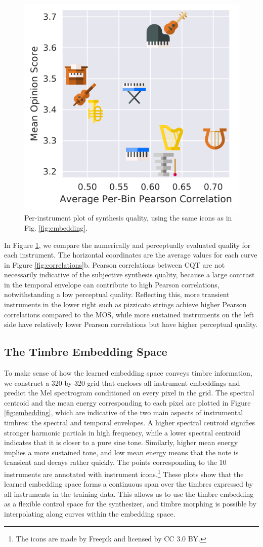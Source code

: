 \begin{figure}[t]
	\centering
	\includegraphics[width=0.4\linewidth]{scatter.pdf}
	\caption{Per-instrument plot of synthesis quality, using the same icons as in Fig. \ref{fig:embedding}.\newline}
	\label{fig:scatter}
	\vspace{-1em}
\end{figure}

In Figure \ref{fig:scatter}, we compare the numerically and perceptually evaluated quality for each instrument.
The horizontal coordinates are the average values for each curve in Figure \ref{fig:correlations}b.
Pearson correlations between CQT are not necessarily indicative of the subjective synthesis quality, because a large contrast in the temporal envelope can contribute to high Pearson correlations, notwithstanding a low perceptual quality.
Reflecting this, more transient instruments in the lower right such as pizzicato strings achieve higher Pearson correlations compared to the MOS, while more sustained instruments on the left side have relatively lower Pearson correlations but have higher perceptual quality.


\subsection{The Timbre Embedding Space}

To make sense of how the learned embedding space conveys timbre information, we construct a 320-by-320 grid that encloses all instrument embeddings and predict the Mel spectrogram conditioned on every pixel in the grid.
The spectral centroid and the mean energy corresponding to each pixel are plotted in Figure \ref{fig:embedding}, which are indicative of the two main aspects of instrumental timbres: the spectral and temporal envelopes.
A higher spectral centroid signifies stronger harmonic partials in high frequency, while a lower spectral centroid indicates that it is closer to a pure sine tone.
Similarly, higher mean energy implies a more sustained tone, and low mean energy means that the note is transient and decays rather quickly.
The points corresponding to the 10 instruments are annotated with instrument icons.\footnote{The icons are made by Freepik and licensed by CC 3.0 BY.}
These plots show that the learned embedding space forms a continuous span over the timbres expressed by all instruments in the training data.
This allows us to use the timbre embedding as a flexible control space for the synthesizer, and timbre morphing is possible by interpolating along curves within the embedding space.


